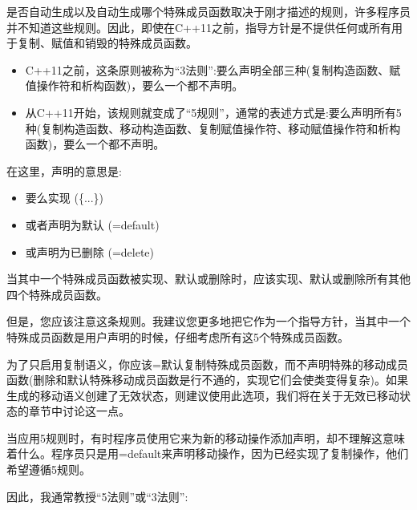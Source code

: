 是否自动生成以及自动生成哪个特殊成员函数取决于刚才描述的规则，许多程序员并不知道这些规则。因此，即使在C++11之前，指导方针是不提供任何或所有用于复制、赋值和销毁的特殊成员函数。\par

\begin{itemize}
	\item C++11之前，这条原则被称为“3法则”:要么声明全部三种(复制构造函数、赋值操作符和析构函数)，要么一个都不声明。
	\item 从C++11开始，该规则就变成了“5规则”，通常的表述方式是:要么声明所有5种(复制构造函数、移动构造函数、复制赋值操作符、移动赋值操作符和析构函数)，要么一个都不声明。
\end{itemize}

在这里，声明的意思是:\par

\begin{itemize}
	\item 要么实现 (\{...\})
	\item 或者声明为默认 (=default)
	\item 或声明为已删除 (=delete)
\end{itemize}

当其中一个特殊成员函数被实现、默认或删除时，应该实现、默认或删除所有其他四个特殊成员函数。\par

但是，您应该注意这条规则。我建议您更多地把它作为一个指导方针，当其中一个特殊成员函数是用户声明的时候，仔细考虑所有这5个特殊成员函数。\par

为了只启用复制语义，你应该=默认复制特殊成员函数，而不声明特殊的移动成员函数(删除和默认特殊移动成员函数是行不通的，实现它们会使类变得复杂)。如果生成的移动语义创建了无效状态，则建议使用此选项，我们将在关于无效已移动状态的章节中讨论这一点。\par

当应用5规则时，有时程序员使用它来为新的移动操作添加声明，却不理解这意味着什么。程序员只是用=default来声明移动操作，因为已经实现了复制操作，他们希望遵循5规则。\par

因此，我通常教授“5法则”或“3法则”:\par

